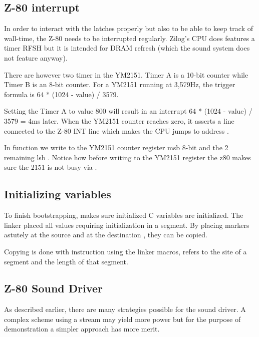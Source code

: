 \subsection{Z-80 interrupt}
In order to interact with the latches properly but also to be able to keep track of wall-time, the Z-80 needs to be interrupted regularly. Zilog's CPU does features a timer RFSH but it is intended for DRAM refresh (which the sound system does not feature anyway).

There are however two timer in the YM2151. Timer A is a 10-bit counter while Timer B is an 8-bit counter. For a YM2151 running at 3,579Hz, the trigger formula is 64 * (1024 - value) / 3579.

Setting the Timer A to value 800 will result in an interrupt 64 * (1024 - value) / 3579 = 4ms later. When the YM2151 counter reaches zero, it asserts a line connected to the Z-80 INT line which makes the CPU jumps to address .



In function  we write to the YM2151 counter register msb 8-bit  and the 2 remaining lsb . Notice how before writing to the YM2151 register the z80 makes sure the 2151 is not busy via .





\subsection{Initializing variables}
To finish bootstrapping,  makes sure initialized C variables are initialized. The linker placed all values requiring initialization in a  segment. By placing markers astutely at the source  and at the destination , they can be copied.



Copying is done with  instruction using the linker macros,  refers to the site of a segment and  the length of that segment.


 



\subsection{Z-80 Sound Driver}
As described earlier, there are many strategies possible for the sound driver. A complex scheme using a stream may yield more power but for the purpose of demonstration a simpler approach has more merit.

